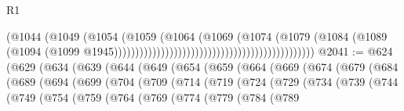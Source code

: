 \begin{lexlean}{R1}
\begin{coremodule}
                                                                          (@1044
                                                                            (@1049
                                                                              (@1054
                                                                                (@1059
                                                                                  (@1064
                                                                                    (@1069
                                                                                      (@1074
                                                                                        (@1079
                                                                                          (@1084
                                                                                            (@1089
                                                                                              (@1094
                                                                                                (@1099
                                                                                                  @1945)))))))))))))))))))))))))))))))))))))))))))))))
@2041 := @624
    (@629
      (@634
        (@639
          (@644
            (@649
              (@654
                (@659
                  (@664
                    (@669
                      (@674
                        (@679
                          (@684
                            (@689
                              (@694
                                (@699
                                  (@704
                                    (@709
                                      (@714
                                        (@719
                                          (@724
                                            (@729
                                              (@734
                                                (@739
                                                  (@744
                                                    (@749
                                                      (@754
                                                        (@759
                                                          (@764
                                                            (@769
                                                              (@774
                                                                (@779
                                                                  (@784
                                                                    (@789

\end{coremodule}
\end{lexlean}
